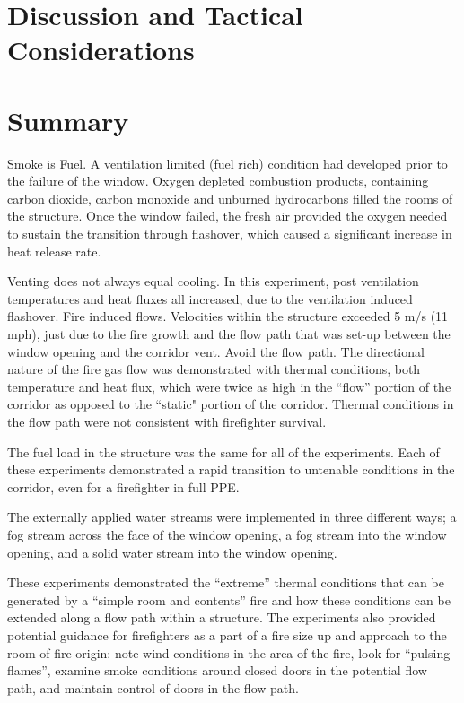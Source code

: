 \documentclass[12pt,oneside]{book}
\begin{document}
\chapter{Discussion and Tactical Considerations}
\label{chap:Discussion_and_Tactical_Considerations}

\chapter{Summary}
\label{chap:Summary}


Smoke is Fuel. A ventilation limited (fuel rich) condition had developed prior to the failure of the window. Oxygen depleted combustion products, containing carbon dioxide, carbon monoxide and
unburned hydrocarbons filled the rooms of the structure. Once the window failed, the fresh air provided the oxygen needed to sustain the transition through flashover, which caused a significant increase in heat release rate.

Venting does not always equal cooling. In this experiment, post ventilation temperatures and heat fluxes all increased, due to the ventilation induced flashover. Fire induced flows. Velocities within the structure exceeded 5 m/s (11 mph), just due to the fire growth and the flow path that was set-up between the window opening and the corridor vent. Avoid the flow path. The directional nature of the fire gas flow was demonstrated with thermal conditions, both temperature and heat flux, which were twice as high in the ``flow'' portion of the
corridor as opposed to the ``static" portion of the corridor. Thermal conditions in the flow path were not consistent with firefighter survival.

The fuel load in the structure was the same for all of the experiments. Each of these experiments demonstrated a rapid transition to untenable conditions in the corridor, even for a firefighter in full PPE.

The externally applied water streams were implemented in three different ways; a fog stream across the face of the window opening, a fog stream into the window opening, and a solid water stream into the window opening.

These experiments demonstrated the ``extreme'' thermal conditions that can be generated by a ``simple room and contents'' fire and how these conditions can be extended along a flow path within a structure. The experiments also provided potential guidance for firefighters as a part of a fire size up and approach to the room of fire origin: note wind conditions in the area of the fire, look for ``pulsing flames'', examine smoke conditions around closed doors in the potential flow path, and maintain control of doors in the flow path.
\end{document}
